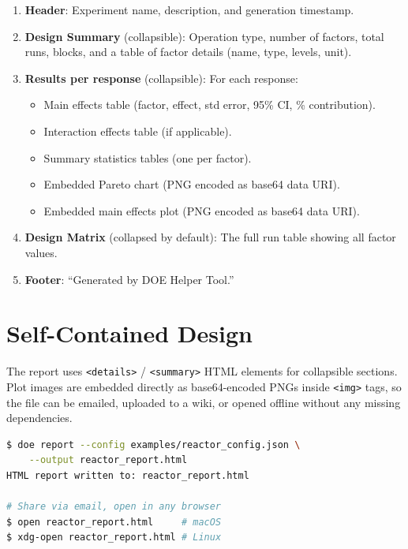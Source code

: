 \documentclass[11pt]{book}
\begin{document}
\begin{enumerate}
  \item \textbf{Header}: Experiment name, description, and generation timestamp.
  \item \textbf{Design Summary} (collapsible): Operation type, number of factors, total runs, blocks, and a table of factor details (name, type, levels, unit).
  \item \textbf{Results per response} (collapsible): For each response:
    \begin{itemize}[nosep]
      \item Main effects table (factor, effect, std error, 95\% CI, \% contribution).
      \item Interaction effects table (if applicable).
      \item Summary statistics tables (one per factor).
      \item Embedded Pareto chart (PNG encoded as base64 data URI).
      \item Embedded main effects plot (PNG encoded as base64 data URI).
    \end{itemize}
  \item \textbf{Design Matrix} (collapsed by default): The full run table showing all factor values.
  \item \textbf{Footer}: ``Generated by DOE Helper Tool.''
\end{enumerate}

\section{Self-Contained Design}

The report uses \texttt{<details>} / \texttt{<summary>} HTML elements for collapsible sections. Plot images are embedded directly as base64-encoded PNGs inside \texttt{<img>} tags, so the file can be emailed, uploaded to a wiki, or opened offline without any missing dependencies.

\begin{example}
\begin{lstlisting}[language=bash]
$ doe report --config examples/reactor_config.json \
    --output reactor_report.html
HTML report written to: reactor_report.html

# Share via email, open in any browser
$ open reactor_report.html     # macOS
$ xdg-open reactor_report.html # Linux
\end{lstlisting}
\end{example}
\end{document}

